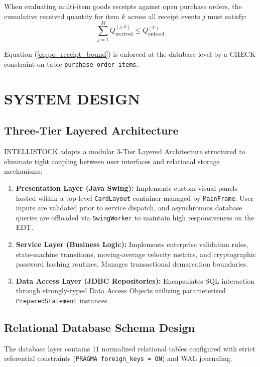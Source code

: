 \documentclass[BTech]{srmuthesis}
\begin{document}
When evaluating multi-item goods receipts against open purchase orders, the cumulative received quantity for item $k$ across all receipt events $j$ must satisfy:
\begin{equation}
\sum_{j=1}^{M} Q_{\text{received}}^{(j, k)} \le Q_{\text{ordered}}^{(k)}
\label{eq:po_receipt_bound}
\end{equation}

Equation (\ref{eq:po_receipt_bound}) is enforced at the database level by a CHECK constraint on table \texttt{purchase\_order\_items}.

\chapter{SYSTEM DESIGN}
\label{chap:design}

\section{Three-Tier Layered Architecture}
INTELLISTOCK adopts a modular 3-Tier Layered Architecture structured to eliminate tight coupling between user interfaces and relational storage mechanisms:
\begin{enumerate}
    \item \textbf{Presentation Layer (Java Swing):} Implements custom visual panels hosted within a top-level \texttt{CardLayout} container managed by \texttt{MainFrame}. User inputs are validated prior to service dispatch, and asynchronous database queries are offloaded via \texttt{SwingWorker} to maintain high responsiveness on the \ac{EDT}.
    \item \textbf{Service Layer (Business Logic):} Implements enterprise validation rules, state-machine transitions, moving-average velocity metrics, and cryptographic password hashing routines. Manages transactional demarcation boundaries.
    \item \textbf{Data Access Layer (JDBC Repositories):} Encapsulates SQL interaction through strongly-typed Data Access Objects utilizing parameterized \texttt{PreparedStatement} instances.
\end{enumerate}

\section{Relational Database Schema Design}
The database layer contains 11 normalized relational tables configured with strict referential constraints (\texttt{PRAGMA foreign\_keys = ON}) and WAL journaling.
\end{document}

